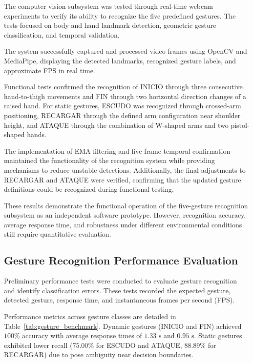 \documentclass[lettersize,journal]{IEEEtran}
\begin{document}
	The computer vision subsystem was tested through real-time webcam experiments to verify its ability to recognize the five predefined gestures. The tests focused on body and hand landmark detection, geometric gesture classification, and temporal validation.
	
	The system successfully captured and processed video frames using OpenCV and MediaPipe, displaying the detected landmarks, recognized gesture labels, and approximate FPS in real time.
	
	Functional tests confirmed the recognition of INICIO through three consecutive hand-to-thigh movements and FIN through two horizontal direction changes of a raised hand. For static gestures, ESCUDO was recognized through crossed-arm positioning, RECARGAR through the defined arm configuration near shoulder height, and ATAQUE through the combination of W-shaped arms and two pistol-shaped hands.
	
	The implementation of EMA filtering and five-frame temporal confirmation maintained the functionality of the recognition system while providing mechanisms to reduce unstable detections. Additionally, the final adjustments to RECARGAR and ATAQUE were verified, confirming that the updated gesture definitions could be recognized during functional testing.
	
	These results demonstrate the functional operation of the five-gesture recognition subsystem as an independent software prototype. However, recognition accuracy, average response time, and robustness under different environmental conditions still require quantitative evaluation.
	
	\subsection{Gesture Recognition Performance Evaluation}
	
	Preliminary performance tests were conducted to evaluate gesture recognition and identify classification errors. These tests recorded the expected gesture, detected gesture, response time, and instantaneous frames per second (FPS).
	
	Performance metrics across gesture classes are detailed in Table~\ref{tab:gesture_benchmark}. Dynamic gestures (INICIO and FIN) achieved $100\%$ accuracy with average response times of $1.33\text{ s}$ and $0.95\text{ s}$. Static gestures exhibited lower recall ($75.00\%$ for ESCUDO and ATAQUE, $88.89\%$ for RECARGAR) due to pose ambiguity near decision boundaries.
	
\end{document}
